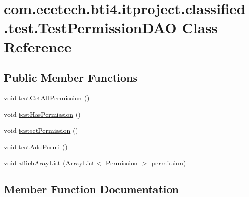 \hypertarget{classcom_1_1ecetech_1_1bti4_1_1itproject_1_1classified_1_1test_1_1_test_permission_d_a_o}{}\section{com.\+ecetech.\+bti4.\+itproject.\+classified.\+test.\+Test\+Permission\+D\+AO Class Reference}
\label{classcom_1_1ecetech_1_1bti4_1_1itproject_1_1classified_1_1test_1_1_test_permission_d_a_o}
\subsection*{Public Member Functions}
\begin{DoxyCompactItemize}
\item 
void \hyperlink{classcom_1_1ecetech_1_1bti4_1_1itproject_1_1classified_1_1test_1_1_test_permission_d_a_o_a16bd99aafae0c6a435d173a357689e38}{test\+Get\+All\+Permission} ()
\item 
void \hyperlink{classcom_1_1ecetech_1_1bti4_1_1itproject_1_1classified_1_1test_1_1_test_permission_d_a_o_a32d21ef8eb20a721573e82e0838384dc}{test\+Has\+Permission} ()
\item 
void \hyperlink{classcom_1_1ecetech_1_1bti4_1_1itproject_1_1classified_1_1test_1_1_test_permission_d_a_o_a4589b2226bb846aee06beea085808b2e}{testset\+Permission} ()
\item 
void \hyperlink{classcom_1_1ecetech_1_1bti4_1_1itproject_1_1classified_1_1test_1_1_test_permission_d_a_o_acf5b38a15547d9c632015060ad8ca937}{test\+Add\+Permi} ()
\item 
void \hyperlink{classcom_1_1ecetech_1_1bti4_1_1itproject_1_1classified_1_1test_1_1_test_permission_d_a_o_a107d4746be83c388ea3dc7c2e0d7f9e7}{affich\+Aray\+List} (Array\+List$<$ \hyperlink{classcom_1_1ecetech_1_1bti4_1_1itproject_1_1classified_1_1beans_1_1_permission}{Permission} $>$ permission)
\end{DoxyCompactItemize}


\subsection{Member Function Documentation}
